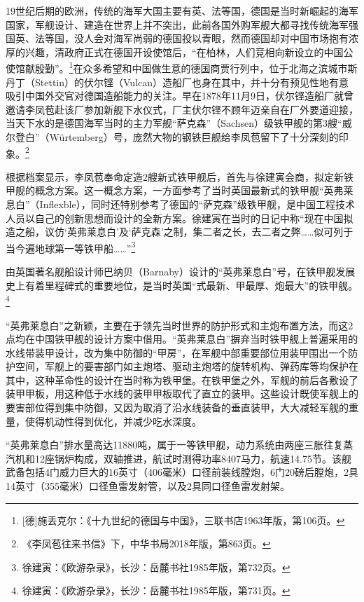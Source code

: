 \documentclass[12pt,UTF8]{ctexbook}
\begin{document}
19世纪后期的欧洲，传统的海军大国主要有英、法等国，德国是当时新崛起的海军国家，军舰设计、建造在世界上并不突出，此前各国外购军舰大都寻找传统海军强国英、法等国，没人会对海军尚弱的德国投以青眼，然而德国却对中国市场抱有浓厚的兴趣，清政府正式在德国开设使馆后，“在柏林，人们竞相向新设立的中国公使馆献殷勤”。\footnote{[德]施丢克尔：《十九世纪的德国与中国》，三联书店1963年版，第106页。}在众多希望和中国做生意的德国商贾行列中，位于北海之滨城市斯丹丁（Stettin）的伏尔铿（Vulcan）造船厂也身在其中，并十分有预见性地有意吸引中国外交官对德国造船能力的关注。早在1878年11月9日，伏尔铿造船厂就曾邀请李凤苞赴该厂参加新舰下水仪式，厂主伏尔铿不顾年迈亲自在厂外要道迎接，当天下水的是德国海军当时的主力军舰“萨克森”（Sachsen）级铁甲舰的第3艘“威尔登白”（Würtemberg）号，庞然大物的钢铁巨舰给李凤苞留下了十分深刻的印象。\footnote{《李凤苞往来书信》下，中华书局2018年版，第863页。}

根据档案显示，李凤苞奉命定造2艘新式铁甲舰后，首先与徐建寅会商，拟定新铁甲舰的概念方案。这一概念方案，一方面参考了当时英国最新式的铁甲舰“英弗莱息白”（Inflexble），同时还特别参考了德国的“萨克森”级铁甲舰，是中国工程技术人员以自己的创新思想而设计的全新方案。徐建寅在当时的日记中称“现在中国拟造之船，议仿‘英弗莱息白’及‘萨克森’之制，集二者之长，去二者之弊……似可列于当今遍地球第一等铁甲船……”\footnote{徐建寅：《欧游杂录》，长沙：岳麓书社1985年版，第732页。}

由英国著名舰船设计师巴纳贝（Barnaby）设计的“英弗莱息白”号，在铁甲舰发展史上有着里程碑式的重要地位，是当时英国“式最新、甲最厚、炮最大”的铁甲舰。\footnote{徐建寅：《欧游杂录》，长沙：岳麓书社1985年版，第731页。}

“英弗莱息白”之新颖，主要在于领先当时世界的防护形式和主炮布置方法，而这2点均在中国铁甲舰的设计方案中借用。“英弗莱息白”摒弃当时铁甲舰上普遍采用的水线带装甲设计，改为集中防御的“甲房”，在军舰中部重要部位用装甲围出一个防护空间，军舰上的要害部门如主炮塔、驱动主炮塔的旋转机构、弹药库等均保护在其中，这种革命性的设计在当时称为铁甲堡。在铁甲堡之外，军舰的前后各敷设了装甲甲板，用这种低于水线的装甲甲板取代了直立的装甲。这些设计既使军舰上的要害部位得到集中防御，又因为取消了沿水线装备的垂直装甲，大大减轻军舰的重量，使得机动性得到优化，并减少吃水深度。

“英弗莱息白”排水量高达11880吨，属于一等铁甲舰，动力系统由两座三胀往复蒸汽机和12座锅炉构成，双轴推进，航试时测得功率8407马力，航速14.75节。该舰武备包括4门威力巨大的16英寸（406毫米）口径前装线膛炮，6门20磅后膛炮，2具14英寸（355毫米）口径鱼雷发射管，以及2具同口径鱼雷发射架。
\end{document}
